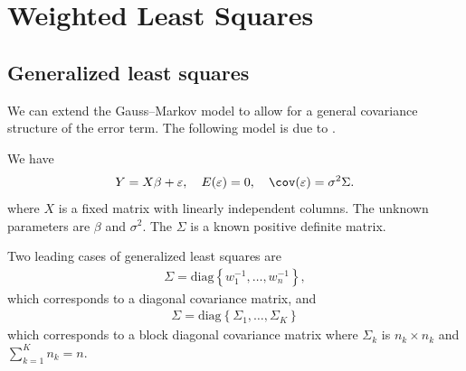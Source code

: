  
\chapter{Weighted Least Squares}\label{chapter::WLS}
 
\section{Generalized least squares}\label{section::GLS}

We can extend the Gauss--Markov model to allow for a general covariance
structure of the error term. The following model is due to \citet{aitkin1936least}.


\begin{assumption}
\label{assume::g-gaussmarkov}
We have 
\begin{eqnarray}
\label{eq::gls-model}
Y=X\beta+\varepsilon, \quad E(\varepsilon) = 0,\quad \cov(\varepsilon) = \sigma^2 \Sigma.
\end{eqnarray}
where $X$ is a fixed matrix with linearly independent columns.
The unknown parameters are  $\beta $ and $ \sigma^{2}$.
The $\Sigma$ is a known positive definite matrix.
\end{assumption}






Two leading cases of generalized least squares are
\begin{eqnarray}
\label{eq::diagonal-sigma}
\Sigma=\text{diag}\left\{ w_{1}^{-1},\ldots,w_{n}^{-1}\right\} ,
\end{eqnarray}
which corresponds to  a diagonal
covariance matrix, and 
\begin{eqnarray}
\label{eq::block-diagonal-sigma}
\Sigma = \text{diag}\left\{ \Sigma_1,\ldots, \Sigma_K\right\}
\end{eqnarray}
which corresponds to a block diagonal covariance matrix where $\Sigma_k$ is $n_k\times n_k$ and $\sum_{k=1}^K n_k = n$. 

